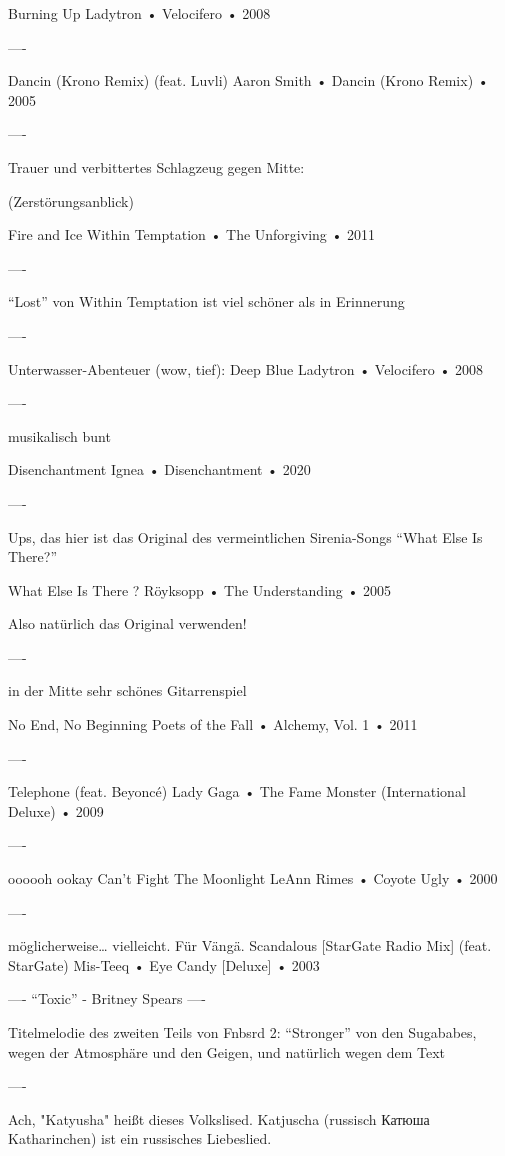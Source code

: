 Burning Up
Ladytron
 •
Velocifero
 •
2008

----

Dancin (Krono Remix) (feat. Luvli)
Aaron Smith
 •
Dancin (Krono Remix)
 •
2005

----

Trauer und verbittertes Schlagzeug gegen Mitte:

(Zerstörungsanblick)

Fire and Ice
Within Temptation
 •
The Unforgiving
 •
2011

----

“Lost” von Within Temptation ist viel schöner als in Erinnerung

----

Unterwasser-Abenteuer (wow, tief):
Deep Blue
Ladytron
 •
Velocifero
 •
2008

----

musikalisch bunt

Disenchantment
Ignea
 •
Disenchantment
 •
2020

----

Ups, das hier ist das Original des vermeintlichen Sirenia-Songs “What Else Is There?”

What Else Is There ?
Röyksopp
 •
The Understanding
 •
2005

Also natürlich das Original verwenden!

----

in der Mitte sehr schönes Gitarrenspiel

No End, No Beginning
Poets of the Fall
 •
Alchemy, Vol. 1
 •
2011

----

Telephone (feat. Beyoncé)
Lady Gaga
•
The Fame Monster (International Deluxe)
• 2009

----

oooooh
ookay
Can't Fight The Moonlight
LeAnn Rimes
•
Coyote Ugly
• 2000

----

möglicherweise… vielleicht. Für Vängä.
Scandalous [StarGate Radio Mix] (feat. StarGate)
Mis-Teeq
 •
Eye Candy [Deluxe]
 •
2003

----
“Toxic” - Britney Spears
----

Titelmelodie des zweiten Teils von Fnbsrd 2: “Stronger” von den Sugababes, wegen der Atmosphäre und den Geigen, und natürlich wegen dem Text

----


Ach, "Katyusha" heißt dieses Volkslised.
Katjuscha (russisch Катюша Katharinchen) ist ein russisches Liebeslied.

